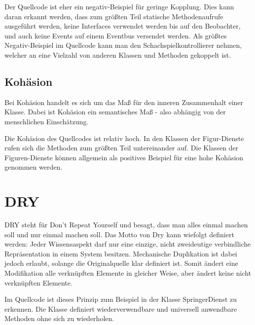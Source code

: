 Der Quellcode ist eher ein negativ-Beispiel für geringe Kopplung. Dies kann daran erkannt werden, dass zum größten Teil statische Methodenaufrufe ausgeführt werden, keine Interfaces verwendet werden bis auf den Beobachter, und auch keine Events auf einem Eventbus versendet werden. Als größtes Negativ-Beispiel im Quellcode kann man den Schachspielkontrollierer nehmen, welcher an eine Vielzahl von anderen Klassen und Methoden gekoppelt ist.

\subsection{Kohäsion}
Bei Kohäsion handelt es sich um das Maß für den inneren Zusammenhalt einer Klasse. Dabei ist Kohäsion ein semantisches Maß - also abhängig von der menschlichen Einschätzung.

Die Kohäsion des Quellcodes ist relativ hoch. In den Klassen der Figur-Dienste rufen sich die Methoden zum größten Teil untereinander auf. Die Klassen der Figuren-Dienste können allgemein als positives Beispiel für eine hohe Kohäsion genommen werden.


\section{DRY}

DRY steht für Don't Repeat Yourself und besagt, dass man alles einmal machen soll und nur einmal machen soll. Das Motto von Dry kann wiefolgt definiert werden: \glqq{} Jeder Wissensaspekt darf nur eine einzige, nicht zweideutige verbindliche Repräsentation in einem System besitzen\grqq{}. Mechanische Duplikation ist dabei jedoch erlaubt, solange die Originalquelle klar definiert ist. Somit ändert eine Modifikation alle verknüpften Elemente in gleicher Weise, aber ändert keine nicht verknüpften Elemente.

Im Quellcode ist dieses Prinzip zum Beispiel in der Klasse SpringerDienst zu erkennen. Die Klasse definiert wiederverwendbare und universell anwendbare Methoden ohne sich zu wiederholen.